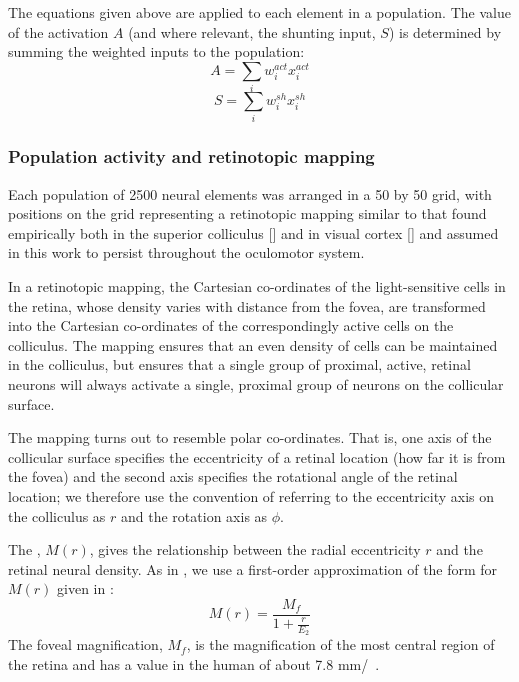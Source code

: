 \documentclass{frontiersSCNS}
\begin{document}
The equations given above are applied to each element in a
population. The value of the activation $A$ (and where relevant, the
shunting input, $S$) is determined by summing the weighted
inputs to the population:
\begin{equation}
A = \sum_{i}w_i^{act} x_i^{act}
\end{equation}
\begin{equation}
S = \sum_{i}w_i^{sh} x_i^{sh}
\end{equation}

%
%

\subsubsection{Population activity and retinotopic mapping}

Each population of 2500 neural elements was arranged in a 50 by 50
grid, with positions on the grid representing a retinotopic
mapping similar to that found empirically both in the superior
colliculus [\cite{ottes_visuomotor_1986}] and in visual cortex
[\cite{eric_l._schwartz_computational_1980}] and assumed in
this work to persist throughout the oculomotor system.

In a retinotopic mapping, the Cartesian co-ordinates of the light-sensitive
cells in the retina, whose density varies with distance from the fovea,
are transformed into the Cartesian co-ordinates of
the correspondingly active cells on the colliculus. The mapping ensures
that an even density of cells can be maintained in the colliculus, but
ensures that a single group of proximal, active, retinal neurons will
always activate a single, proximal group of neurons on the collicular
surface.

The mapping turns out to resemble polar co-ordinates. That is, one
axis of the collicular surface specifies the eccentricity of
a retinal location (how far it is from the fovea) and the second axis
specifies the rotational angle of the retinal location; we therefore
use the convention of referring to the eccentricity axis on the
colliculus as $r$ and the rotation axis as $\phi$.

The , $M(r)$, gives the relationship
between the
radial eccentricity $r$ and the retinal neural density. As in
\cite{cope_basal_2017}, we use a first-order approximation of the form
for $M(r)$ given in  \cite{rovamo_estimation_1979}:
\begin{equation} \label{eq:cmf}
M(r) = \frac{M_f}{1+\frac{r}{E_2}}
\end{equation}
The foveal magnification, $M_f$, is the magnification of the most central
region of the retina and has a value in the human of about
7.8 mm/\dg~\cite{rovamo_estimation_1979}.
\end{document}
